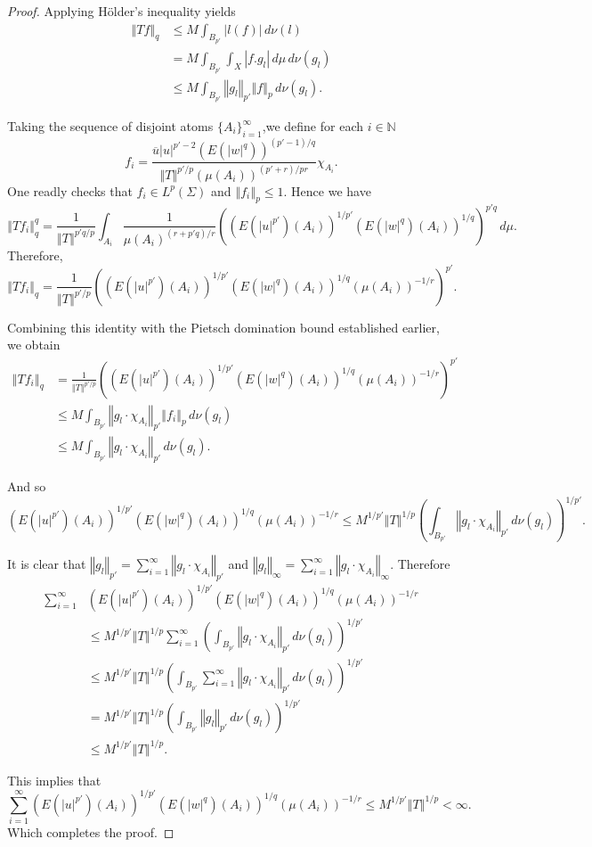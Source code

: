 \documentclass{amsart}
\theoremstyle{definition}\newtheorem{defn}[thm]{Definition}
\theoremstyle{remark}
\numberwithin{equation}{section}
\newcommand{\norm}[1]{\left\Vert#1\right\Vert}
\begin{document}
\begin{proof}
		Applying Hölder's inequality yields
	\begin{align*}
		\norm{T f}_q &\leq M \int_{B_{p'}} |l(f)| \, d\nu(l) \\
		&= M \int_{B_{p'}} \int_X |f . g_l| \, d\mu \, d\nu(g_l) \\
		&\leq M \int_{B_{p'}} \norm{g_l}_{p'} \norm{f}_p \, d\nu(g_l).
	\end{align*}
	
	Taking the sequence of disjoint atoms $\{A_i\}_{i=1}^{\infty}$,we define for each $i \in \mathbb N$
	\[
	f_i = \frac{\overline u |u|^{{p'}-2} (E(|w|^q))^{({p'}-1)/q}}{\norm{T}^{{p'}/p} (\mu(A_i))^{({p'}+r)/pr}} \chi_{A_i}.
	\]
	One readly checks that $f_i \in L^p(\Sigma)$ and $\norm{f_i}_p \leq 1$. Hence we have
	\[
	\norm{T f_i}_q^q = \frac{1}{\norm{T}^{p'q/p}} \int_{A_i} \frac{1}{\mu(A_i)^{({r+p'q})/r}} \left( (E(|u|^{p'})(A_i))^{1/{p'}} (E(|w|^q)(A_i))^{1/q} \right)^{p'q} \, d\mu.
	\]
	Therefore,
	\[
	\norm{T f_i}_q = \frac{1}{\norm{T}^{{p'}/p}} \left( (E(|u|^{p'})(A_i))^{1/{p'}} (E(|w|^q)(A_i))^{1/q} (\mu(A_i))^{-1/r} \right)^{p'}.
	\]
	
	Combining this identity with the Pietsch domination bound established earlier, we obtain
	\begin{align*}
		\norm{T f_i}_q &= \frac{1}{\norm{T}^{{p'}/p}} \left( (E(|u|^{p'})(A_i))^{1/{p'}} (E(|w|^q)(A_i))^{1/q} (\mu(A_i))^{-1/r} \right)^{p'} \\
		&\leq M \int_{B_{p'}} \norm{g_l\cdot \chi_{A_i}}_{p'} \norm{f_i}_p \, d\nu(g_l) \\
		&\leq M \int_{B_{p'}} \norm{g_l\cdot \chi_{A_i}}_{p'} \, d\nu(g_l).
	\end{align*}
	
	And so
	\[
	(E(|u|^{p'})(A_i))^{1/{p'}} (E(|w|^q)(A_i))^{1/q} (\mu(A_i))^{-1/r} \leq M^{1/{p'}} \norm{T}^{1/p} \left( \int_{B_{p'}} \norm{g_l \cdot\chi_{A_i}}_{p'} \, d\nu(g_l) \right)^{1/{p'}}.
	\]
	
	It is clear that $\norm{g_l}_{p'} = \sum_{i=1}^{\infty} \norm{g_l\cdot \chi_{A_i}}_{p'} $ and $\norm{g_l}_{\infty} = \sum_{i=1}^{\infty} \norm{g_l\cdot \chi_{A_i}}_{\infty} $. Therefore
	\begin{align*}
		\sum_{i=1}^{\infty} & (E(|u|^{p'})(A_i))^{1/{p'}} (E(|w|^q)(A_i))^{1/q} (\mu(A_i))^{-1/r} \\
		&\leq M^{1/{p'}} \norm{T}^{1/p} \sum_{i=1}^{\infty} \left( \int_{B_{p'}} \norm{g_l\cdot \chi_{A_i}}_{p'} \, d\nu(g_l) \right)^{1/{p'}} \\
		&\leq M^{1/{p'}} \norm{T}^{1/p} \left( \int_{B_{p'}} \sum_{i=1}^{\infty} \norm{g_l\cdot\chi_{A_i}}_{p'} \, d\nu(g_l) \right)^{1/{p'}} \\
		&= M^{1/{p'}} \norm{T}^{1/p} \left( \int_{B_{p'}} \norm{g_l}_{p'} \, d\nu(g_l) \right)^{1/{p'}} \\
		&\leq M^{1/{p'}} \norm{T}^{1/p}.
	\end{align*}
	
	This implies that
	\[
	\sum_{i=1}^{\infty} (E(|u|^{p'})(A_i))^{1/{p'}} (E(|w|^q)(A_i))^{1/q} (\mu(A_i))^{-1/r} \leq M^{1/{p'}} \norm{T}^{1/p} < \infty.
	\]
	Which completes the proof.
\end{proof}
\end{document}
